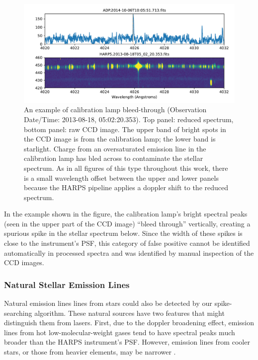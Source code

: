 \documentclass[twocolumn]{aastex701}
\begin{document}
\begin{figure}
    \centering
    \includegraphics[width=\textwidth]{clean-figures/bleedthrough.pdf}
    \caption{An example of calibration lamp bleed-through (Observation Date/Time: 2013-08-18, 05:02:20.353). Top panel: reduced spectrum, bottom panel: raw CCD image. The upper band of bright spots in the CCD image is from the calibration lamp; the lower band is starlight.  Charge from an oversaturated emission line in the calibration lamp has bled across to contaminate the stellar spectrum.  As in all figures of this type throughout this work, there is a small wavelength offset between the upper and lower panels because the HARPS pipeline applies a doppler shift to the reduced spectrum.}
    \label{fig:bleedthrough}
\end{figure}

In the example shown in the figure, the calibration lamp's bright spectral peaks (seen in the upper part of the CCD image) ``bleed through'' vertically, creating a spurious spike in the stellar spectrum below.  Since the width of these spikes is close to the instrument's PSF, this category of false positive cannot be identified automatically in processed spectra and was identified by manual inspection of the CCD images.

\subsubsection{Natural Stellar Emission Lines}
\label{s:stellaremission}
Natural emission lines lines from stars could also be detected by our spike-searching algorithm.  These natural sources have two features that might distinguish them from lasers.  First, due to the doppler broadening effect, emission lines from hot low-molecular-weight gases tend to have spectral peaks much broader than the HARPS instrument's PSF. However, emission lines from cooler stars, or those from heavier elements, may be narrower \citep{Livadiotis_2018}.
 
\end{document}
